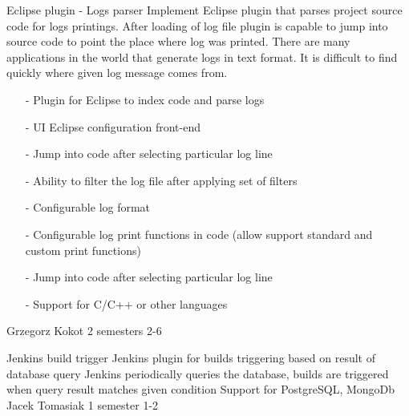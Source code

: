 \begin{project}
{Eclipse plugin - Logs parser}
{
Implement Eclipse plugin that parses project source code for logs printings.
After loading of log file plugin is capable to jump into source code to point
the place where log was printed.
There are many applications in the world that generate logs in text format. It is difficult to find quickly where given log message comes from. 
}
{
 \begin{itemize}
  \item[-] Plugin for Eclipse to index code and parse logs
  \item[-] UI Eclipse configuration front-end
  \item[-] Jump into code after selecting particular log line
  \item[-] Ability to filter the log file after applying set of filters
\end{itemize}
}
{
 \begin{itemize}
  \item[-] Configurable log format
  \item[-] Configurable log print functions in code (allow support standard and custom print functions)
  \item[-] Jump into code after selecting particular log line
  \item[-] Support for C/C++ or other languages
\end{itemize}
}
{Grzegorz Kokot}
{2 semesters}
{2-6}
\end{project}
\begin{project}
{Jenkins build trigger}
{Jenkins plugin for builds triggering based on result of database query} 
{ 
Jenkins periodically queries the database, builds are triggered when query result matches given condition
}
{Support for PostgreSQL, MongoDb}
{Jacek Tomasiak}
{1 semester}
{1-2}
\end{project}
